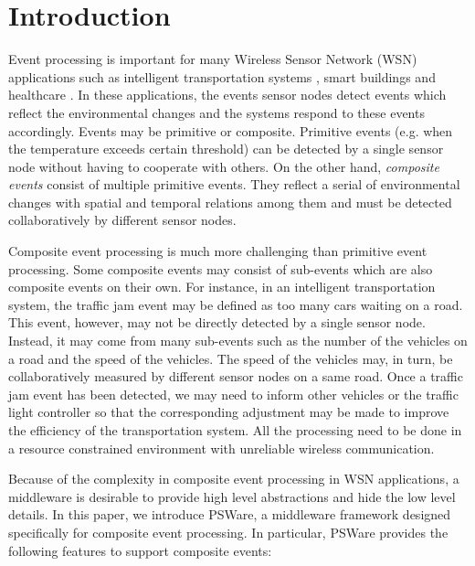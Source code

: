 \section{Introduction}
\label{sec:introduction}

Event processing is important for many Wireless Sensor Network (WSN) applications such as intelligent transportation systems \cite{klein:its}, smart buildings \cite{lynch:shm} and healthcare \cite{lo:ban}. In these applications, the events sensor nodes detect events which reflect the environmental changes and the systems respond to these events accordingly. Events may be primitive or composite. Primitive events (e.g. when the temperature exceeds certain threshold) can be detected by a single sensor node without having to cooperate with others. On the other hand, \emph{composite events} consist of multiple primitive events. They reflect a serial of environmental changes with spatial and temporal relations among them and must be detected collaboratively by different sensor nodes.

Composite event processing is much more challenging than primitive event processing. Some composite events may consist of sub-events which are also composite events on their own. For instance, in an intelligent transportation system, the traffic jam event may be defined as too many cars waiting on a road. This event, however, may not be directly detected by a single sensor node. Instead, it may come from many sub-events such as the number of the vehicles on a road and the speed of the vehicles. The speed of the vehicles may, in turn, be collaboratively measured by different sensor nodes on a same road. Once a traffic jam event has been detected, we may need to inform other vehicles or the traffic light controller so that the corresponding adjustment may be made to improve the efficiency of the transportation system. All the processing need to be done in a resource constrained environment with unreliable wireless communication.

Because of the complexity in composite event processing in WSN applications, a middleware is desirable to provide high level abstractions and hide the low level details. In this paper, we introduce PSWare, a middleware framework designed specifically for composite event processing. In particular, PSWare provides the following features to support composite events:

